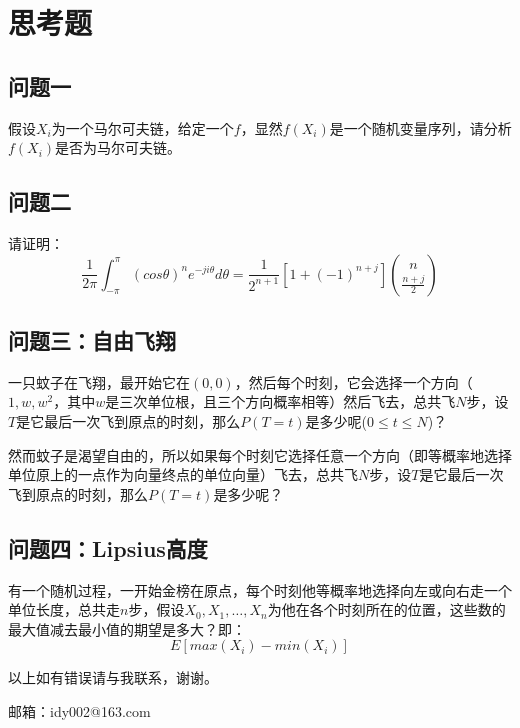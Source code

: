 \section{思考题}
	\subsection{问题一}
		假设$X_i$为一个马尔可夫链，给定一个$f$，显然$f(X_i)$是一个随机变量序列，请分析$f(X_i)$是否为马尔可夫链。

	\subsection{问题二}
		请证明：
		$$
		\frac{1}{2\pi}\int_{-\pi}^{\pi}(cos\theta)^ne^{-ji\theta}d\theta = \frac{1}{2^{n+1}}[1+(-1)^{n+j}]\binom{n}{\frac{n+j}{2}}
		$$
	\subsection{问题三：自由飞翔}
		一只蚊子在飞翔，最开始它在$(0,0)$，然后每个时刻，它会选择一个方向（$1,w,w^2$，其中$w$是三次单位根，且三个方向概率相等）然后飞去，总共飞$N$步，设$T$是它最后一次飞到原点的时刻，那么$P(T=t)$是多少呢($0\leq t \leq N$)？
		
		然而蚊子是渴望自由的，所以如果每个时刻它选择任意一个方向（即等概率地选择单位原上的一点作为向量终点的单位向量）飞去，总共飞$N$步，设$T$是它最后一次飞到原点的时刻，那么$P(T=t)$是多少呢？
		
	\subsection{问题四：Lipsius高度}
		有一个随机过程，一开始金榜在原点，每个时刻他等概率地选择向左或向右走一个单位长度，总共走$n$步，假设$X_0, X_1, \dots, X_n$为他在各个时刻所在的位置，这些数的最大值减去最小值的期望是多大？即：
		$$
			E[max(X_i) - min(X_i)]
		$$
	
	\vspace{2cm}
	以上如有错误请与我联系，谢谢。
	
	邮箱：idy002@163.com
　

